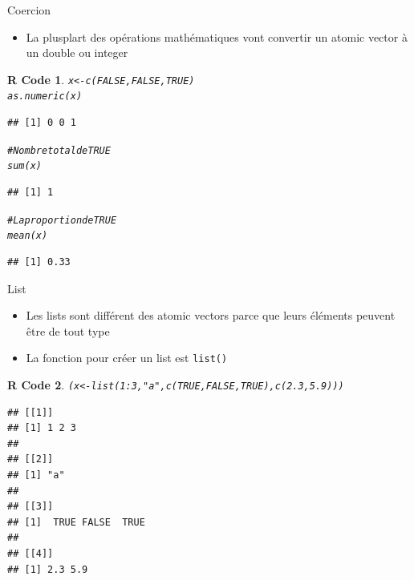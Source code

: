 \documentclass[11pt]{beamer}\usepackage[]{graphicx}\usepackage[]{color}
\makeatletter
\newcommand{\hlnum}[1]{\textcolor[rgb]{0.063,0.58,0.627}{#1}}%
\newcommand{\hlstr}[1]{\textcolor[rgb]{0.063,0.58,0.627}{#1}}%
\newcommand{\hlcom}[1]{\textcolor[rgb]{0.588,0.588,0.588}{#1}}%
\newcommand{\hlopt}[1]{\textcolor[rgb]{0.196,0.196,0.196}{#1}}%
\newcommand{\hlstd}[1]{\textcolor[rgb]{0.196,0.196,0.196}{#1}}%
\newcommand{\hlkwb}[1]{\textcolor[rgb]{0.627,0,0.314}{#1}}%
\newcommand{\hlkwd}[1]{\textcolor[rgb]{0.78,0.227,0.412}{#1}}%
\newenvironment{kframe}{%
 \def\at@end@of@kframe{}%
 \ifinner\ifhmode%
  \def\at@end@of@kframe{\end{minipage}}%
  \begin{minipage}{\columnwidth}%
 \fi\fi%
 \def\FrameCommand##1{\hskip\@totalleftmargin \hskip-\fboxsep
 \colorbox{shadecolor}{##1}\hskip-\fboxsep
     \hskip-\linewidth \hskip-\@totalleftmargin \hskip\columnwidth}%
 \MakeFramed {\advance\hsize-\width
   \@totalleftmargin\z@ \linewidth\hsize
   \@setminipage}}%
 {\par\unskip\endMakeFramed%
 \at@end@of@kframe}
\newenvironment{knitrout}{}{} %
\newtheorem{rcode}{R Code}[section]
\newcommand{\code}[1]{\texttt{#1}}
\makeatother
\begin{document}
\begin{frame}[fragile]{Coercion}
\begin{itemize}
\item La plusplart des opérations mathématiques vont convertir un atomic vector à un double ou integer
\end{itemize}
\begin{knitrout}\footnotesize
{}\color{fgcolor}\begin{kframe}
\begin{rcode}\begin{alltt}
\hlstd{x} \hlkwb{<-} \hlkwd{c}\hlstd{(}\hlnum{FALSE}\hlstd{,} \hlnum{FALSE}\hlstd{,} \hlnum{TRUE}\hlstd{)}
\hlkwd{as.numeric}\hlstd{(x)}
\end{alltt}
\begin{verbatim}
## [1] 0 0 1
\end{verbatim}
\begin{alltt}
\hlcom{# Nombre total de TRUE}
\hlkwd{sum}\hlstd{(x)}
\end{alltt}
\begin{verbatim}
## [1] 1
\end{verbatim}
\begin{alltt}
\hlcom{# La proportion de TRUE}
\hlkwd{mean}\hlstd{(x)}
\end{alltt}
\begin{verbatim}
## [1] 0.33
\end{verbatim}
\end{rcode}\end{kframe}
\end{knitrout}
\end{frame}


\begin{frame}[fragile]{List}

\begin{itemize}
\item Les lists sont différent des atomic vectors parce que leurs éléments peuvent \^{e}tre de tout type
\item La fonction pour créer un list est \code{list()}
\end{itemize}
\pause
\begin{knitrout}\footnotesize
{}\color{fgcolor}\begin{kframe}
\begin{rcode}\begin{alltt}
\hlstd{(x} \hlkwb{<-} \hlkwd{list}\hlstd{(}\hlnum{1}\hlopt{:}\hlnum{3}\hlstd{,} \hlstr{"a"}\hlstd{,} \hlkwd{c}\hlstd{(}\hlnum{TRUE}\hlstd{,} \hlnum{FALSE}\hlstd{,} \hlnum{TRUE}\hlstd{),} \hlkwd{c}\hlstd{(}\hlnum{2.3}\hlstd{,} \hlnum{5.9}\hlstd{)))}
\end{alltt}
\begin{verbatim}
## [[1]]
## [1] 1 2 3
## 
## [[2]]
## [1] "a"
## 
## [[3]]
## [1]  TRUE FALSE  TRUE
## 
## [[4]]
## [1] 2.3 5.9
\end{verbatim}
\end{rcode}\end{kframe}
\end{knitrout}

\end{frame}
\end{document}
